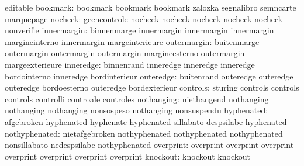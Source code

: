                            editable
                 bookmark: bookmark                  bookmark
                           bookmark                  zalozka
                           segnalibro                semncarte
                           marquepage
                  nocheck: geencontrole              nocheck
                           nocheck                   nocheck
                           nocheck                   nocheck
                           nonverifie
              innermargin: binnenmarge               innermargin
                           innermargin               innermargin
                           margineinterno            innermargin
                           margeinterieure
              outermargin: buitenmarge               outermargin
                           outermargin               outermargin
                           margineesterno            outermargin
                           margeexterieure
                inneredge: binnenrand                inneredge
                           inneredge                 inneredge
                           bordointerno              inneredge
                           bordinterieur
                outeredge: buitenrand                outeredge
                           outeredge                 outeredge
                           bordoesterno              outeredge
                           bordexterieur
                 controls: sturing                   controls
                           controls                  controls
                           controlli                 controale
                           controles
               nothanging: niethangend               nothanging
                           nothanging                nothanging
                           nonsospeso                nothanging
                           nonsuspendu
               hyphenated: afgebroken                hyphenated
                           hyphenate                 hyphenated
                           sillabato                 despsilabe
                           hyphenated
            nothyphenated: nietafgebroken            nothyphenated
                           nothyphenated             nothyphenated
                           nonsillabato              nedespsilabe
                           nothyphenated
                overprint: overprint                 overprint
                           overprint                 overprint
                           overprint                 overprint
                           overprint
                 knockout: knockout                  knockout
